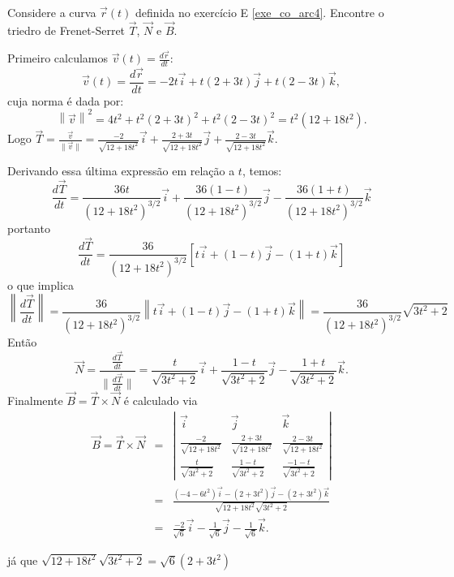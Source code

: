 \begin{exeresol}
  Considere a curva $\vec{r}(t)$ definida no exercício E \ref{exe_co_arc4}. Encontre o triedro de Frenet-Serret $\vec{T}$, $\vec{N}$ e $\vec{B}$.
\end{exeresol}
\begin{resol}
  Primeiro calculamos $\vec{v}(t)=\frac{d\vec{r}}{dt}$:
 $$\vec{v}(t) = \frac{d \vec{r}}{dt} = -2t \vec{i} + t(2+3t) \vec{j} + t(2-3t)\vec{k},$$
 cuja norma é dada por:
  $$\left\|\vec{v} \right\|^2 = 4t^2 + t^2(2+3t)^2 + t^2(2-3t)^2 = t^2(12+18t^2).$$
  Logo $\vec{T} = \frac{\vec{v}}{\|\vec{v}\|} = \frac{-2 }{\sqrt{12+18t^2}}\vec{i} + \frac{2+3t}{\sqrt{12+18t^2}}\vec{j} + \frac{2-3t}{\sqrt{12+18t^2}}\vec{k}$.

  Derivando essa última expressão em relação a $t$, temos:
  $$\frac{d\vec{T}}{dt} = \frac{36t}{(12+18t^2)^{3/2}} \vec{i} + \frac{36(1-t)}{(12+18t^2)^{3/2}} \vec{j} - \frac{36(1+t)}{(12+18t^2)^{3/2}} \vec{k} $$ 
portanto $$\frac{d\vec{T}}{dt} = \frac{36}{(12+18t^2)^{3/2}}\left[  t \vec{i} + (1-t) \vec{j} - (1+t)\vec{k} \right] $$
    o que implica $$\left\|\frac{d\vec{T}}{dt}\right\|= \frac{36}{(12+18t^2)^{3/2}} \left\| t \vec{i} + (1-t) \vec{j} - (1+t)\vec{k} \right\| = \frac{36}{(12+18t^2)^{3/2}} \sqrt{ 3t^2 + 2} $$
    Então
     $$\vec{N} = \frac{\frac{d\vec{T}}{dt}}{\|\frac{d\vec{T}}{dt}\|} = \frac{t}{\sqrt{3t^2+2}} \vec{i} + \frac{1-t}{\sqrt{3t^2+2}} \vec{j} - \frac{1+t}{\sqrt{3t^2+2}} \vec{k}.$$
     Finalmente $ \vec{B} = \vec{T} \times \vec{N}$ é calculado via \begin{eqnarray*}
      \vec{B} = \vec{T} \times \vec{N} &=&
      \left| \begin{array}{ccc}
\vec{i} & \vec{j} & \vec{k} \\
\frac{-2}{\sqrt{12+18t^2}} & \frac{2+3t}{\sqrt{12+18t^2}} & \frac{2-3t}{\sqrt{12+18t^2}} \\
\frac{t}{\sqrt{3t^2+2}} & \frac{1-t}{\sqrt{3t^2+2}} &  \frac{-1-t}{\sqrt{3t^2+2}} \end{array} \right|\\ &=& \frac{(-4-6t^2)\vec{i} - (2+3t^2)\vec{j} - (2+3t^2)\vec{k}}{ \sqrt{12+18t^2} \sqrt{3t^2+2}}\\
&=& \frac{-2}{\sqrt{6}} \vec{i} - \frac{1}{\sqrt{6}} \vec{j} - \frac{1}{\sqrt{6}} \vec{k}.
\end{eqnarray*}

já que $\sqrt{12+18t^2} \sqrt{3t^2+2}= \sqrt{6}(2+3t^2)$
\end{resol}

